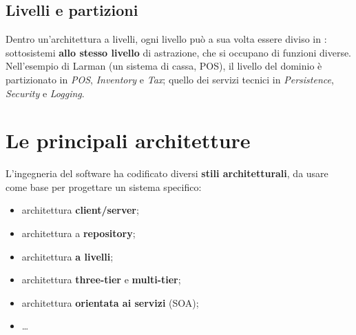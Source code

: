 \subsection{Livelli e partizioni}

Dentro un'architettura a livelli, ogni livello può a sua volta essere diviso in : sottosistemi
\textbf{allo stesso livello} di astrazione, che si occupano di funzioni diverse. Nell'esempio di Larman (un sistema di
cassa, POS), il livello del dominio è partizionato in \textit{POS}, \textit{Inventory} e \textit{Tax}; quello dei servizi
tecnici in \textit{Persistence}, \textit{Security} e \textit{Logging}.

\begin{center}
\end{center}

\section{Le principali architetture}

L'ingegneria del software ha codificato diversi \textbf{stili architetturali}, da usare come base per progettare un sistema
specifico:
\begin{itemize}
  \item architettura \textbf{client/server};
  \item architettura a \textbf{repository};
  \item architettura \textbf{a livelli};
  \item architettura \textbf{three-tier} e \textbf{multi-tier};
  \item architettura \textbf{orientata ai servizi} (SOA);
  \item \ldots
\end{itemize}

